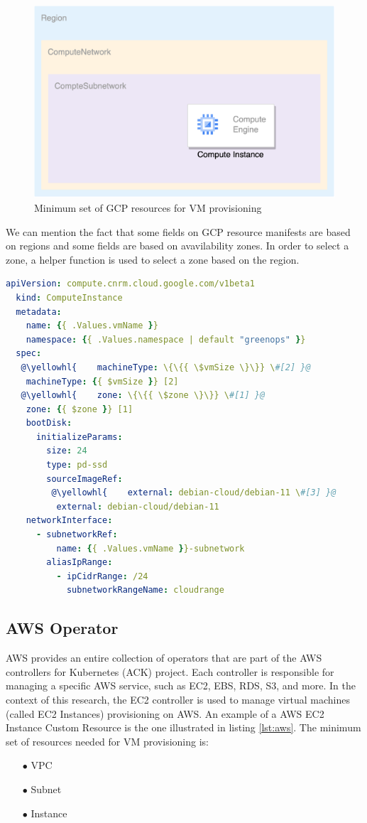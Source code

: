 \begin{figure}[H]
\centering
\includegraphics[width=0.75\linewidth]{images/gcp.png}
\caption{Minimum set of GCP resources for VM provisioning}
\label{fig:gcp}
\end{figure}

We can mention the fact that some fields on GCP resource manifests are based on regions and some fields are based on avavilability zones.
In order to select a zone, a helper function is used to select a zone based on the region.

\begin{lstlisting}[language=yaml, caption={GCP Intance Custom Resource}, label={lst:gcp}]
  apiVersion: compute.cnrm.cloud.google.com/v1beta1
  kind: ComputeInstance
  metadata:
    name: {{ .Values.vmName }}
    namespace: {{ .Values.namespace | default "greenops" }}
  spec:
   @\yellowhl{    machineType: \{\{{ \$vmSize \}\}} \#[2] }@
    machineType: {{ $vmSize }} [2]
   @\yellowhl{    zone: \{\{{ \$zone \}\}} \#[1] }@
    zone: {{ $zone }} [1]
    bootDisk:
      initializeParams:
        size: 24
        type: pd-ssd
        sourceImageRef:
         @\yellowhl{    external: debian-cloud/debian-11 \#[3] }@
          external: debian-cloud/debian-11
    networkInterface:
      - subnetworkRef:
          name: {{ .Values.vmName }}-subnetwork
        aliasIpRange:
          - ipCidrRange: /24
            subnetworkRangeName: cloudrange
\end{lstlisting}

\subsection{AWS Operator}

AWS provides an entire collection of operators that are part of the AWS controllers for Kubernetes (ACK) project.
Each controller is responsible for managing a specific AWS service, such as EC2, EBS, RDS, S3, and more. In the context of this research, the EC2 controller is used to manage virtual machines (called EC2 Instances) provisioning on AWS.
An example of a AWS EC2 Instance Custom Resource is the one illustrated in listing \ref{lst:aws}.
The minimum set of resources needed for VM provisioning is:
\begin{itemize}[itemsep=0.2pt, topsep=1pt] 
\item[$\bullet$] VPC
\item[$\bullet$] Subnet
\item[$\bullet$] Instance
\end{itemize}

